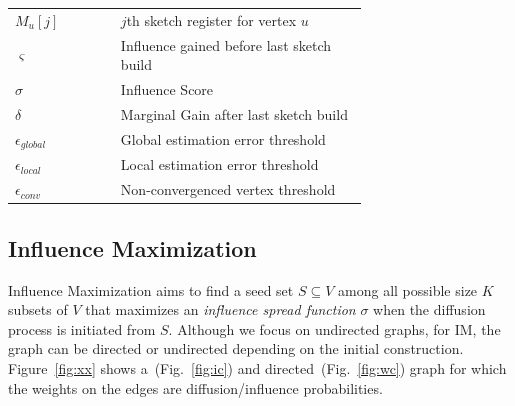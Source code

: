 \documentclass[10pt,journal,compsoc]{IEEEtran}
\begin{document}
\begin{table}[!ht]
\begin{tabular}{|l|p{0.7\linewidth}|}
        $M_u[j]$        & $j$th sketch register for vertex $u$\\
        $\varsigma $    & Influence gained before last sketch build\\
        $\sigma $       & Influence Score\\
        $\delta$        & Marginal Gain after last sketch build\\
        $\epsilon_{global}$    & Global estimation error threshold\\
        $\epsilon_{local}$    & Local estimation error threshold\\ 
        $\epsilon_{conv}$    & Non-convergenced vertex threshold\\
        \hline         
    \end{tabular}
\end{table}
\subsection{Influence Maximization}

Influence Maximization aims to find a seed set $S \subseteq V$ among all possible size $K$ subsets of $V$ that maximizes an {\em influence spread function} $\sigma$  when the diffusion process is initiated from $S$. Although we focus on undirected graphs, for IM, the graph can be directed or undirected depending on the initial construction. Figure~\ref{fig:xx} shows a~(Fig.~\ref{fig:ic}) and directed~(Fig.~\ref{fig:wc})
graph for which the weights on the edges are diffusion/influence probabilities. 
\end{document}
